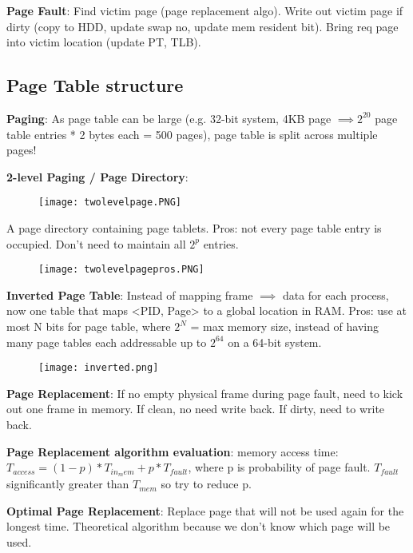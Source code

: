 \documentclass[a4paper,landscape]{article}
\newcommand{\rntopic}[1]{\vspace{-1.5em}\subsection*{#1}\vspace{-0.5em}}
\newcommand{\rnname}[1]{\textbf{#1}}
\begin{document}
\begin{multicols*}{4}
\begin{flatitemize}
\item \rnname{Page Fault}: Find victim page (page replacement algo). Write out victim page if dirty (copy to HDD, update swap no, update mem resident bit). Bring req page into victim location (update PT, TLB).
\rntopic{Page Table structure}
\item \rnname{Paging}: As page table can be large (e.g. 32-bit system, 4KB page $\implies 2^{20}$ page table entries * 2 bytes each = 500 pages), page table is split across multiple pages!
\item \rnname{2-level Paging / Page Directory}:
\vspace{-1.5em}
\begin{figure}[H]
  \texttt{[image: twolevelpage.PNG]}
\end{figure}
\vspace{-1.5em}
A page directory containing page tablets. Pros: not every page table entry is occupied. Don't need to maintain all $2^p$ entries. 
\vspace{-1.5em}
\begin{figure}[H]
  \texttt{[image: twolevelpagepros.PNG]}
\end{figure}
\vspace{-1.5em}
\item \rnname{Inverted Page Table}: Instead of mapping frame $\implies$ data for each process, now one table that maps <PID, Page> to a global location in RAM. Pros: use at most N bits for page table, where $2^N$ = max memory size, instead of having many page tables each addressable up to $2^64$ on a 64-bit system.
\vspace{-1.5em}
\begin{figure}[H]
  \texttt{[image: inverted.png]}
\end{figure}
\vspace{-1.5em}
\item \rnname{Page Replacement}: If no empty physical frame during page fault, need to kick out one frame in memory. If clean, no need write back. If dirty, need to write back. 
\item \rnname{Page Replacement algorithm evaluation}: memory access time: $T_{access} = (1-p) * T_{in_mem} + p * T_{fault}$, where p is probability of page fault. $T_{fault}$ significantly greater than $T_{mem}$ so try to reduce p. 
\item \rnname{Optimal Page Replacement}: Replace page that will not be used again for the longest time. Theoretical algorithm because we don't know which page will be used.

\end{flatitemize}
\end{multicols*}
\end{document}

